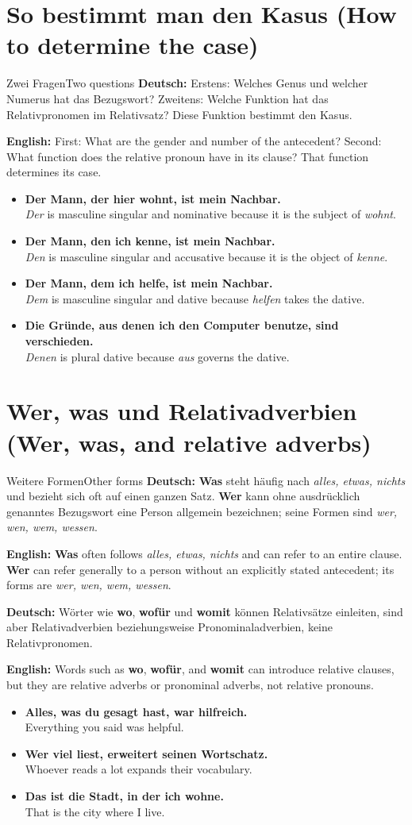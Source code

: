 \documentclass[a4paper,11pt]{article}
\newcommand{\GermanText}[1]{\textbf{Deutsch: }#1\par}
\newcommand{\EnglishText}[1]{{\small\color{SoftGray}\textbf{English: }#1\par}}
\newcommand{\ExampleItem}[2]{\item \textbf{#1}\\{\small\color{SoftGray}#2}}
\begin{document}
\section{So bestimmt man den Kasus (How to determine the case)}
\begin{grammarentry}{Zwei Fragen}{Two questions}
\GermanText{Erstens: Welches Genus und welcher Numerus hat das Bezugswort? Zweitens: Welche Funktion hat das Relativpronomen im Relativsatz? Diese Funktion bestimmt den Kasus.}
\EnglishText{First: What are the gender and number of the antecedent? Second: What function does the relative pronoun have in its clause? That function determines its case.}
\end{grammarentry}
\begin{exbox}\begin{itemize}
\ExampleItem{Der Mann, der hier wohnt, ist mein Nachbar.}{\emph{Der} is masculine singular and nominative because it is the subject of \emph{wohnt}.}
\ExampleItem{Der Mann, den ich kenne, ist mein Nachbar.}{\emph{Den} is masculine singular and accusative because it is the object of \emph{kenne}.}
\ExampleItem{Der Mann, dem ich helfe, ist mein Nachbar.}{\emph{Dem} is masculine singular and dative because \emph{helfen} takes the dative.}
\ExampleItem{Die Gründe, aus denen ich den Computer benutze, sind verschieden.}{\emph{Denen} is plural dative because \emph{aus} governs the dative.}
\end{itemize}\end{exbox}

\section{Wer, was und Relativadverbien (Wer, was, and relative adverbs)}
\begin{grammarentry}{Weitere Formen}{Other forms}
\GermanText{\textbf{Was} steht häufig nach \emph{alles, etwas, nichts} und bezieht sich oft auf einen ganzen Satz. \textbf{Wer} kann ohne ausdrücklich genanntes Bezugswort eine Person allgemein bezeichnen; seine Formen sind \emph{wer, wen, wem, wessen}.}
\EnglishText{\textbf{Was} often follows \emph{alles, etwas, nichts} and can refer to an entire clause. \textbf{Wer} can refer generally to a person without an explicitly stated antecedent; its forms are \emph{wer, wen, wem, wessen}.}
\GermanText{Wörter wie \textbf{wo}, \textbf{wofür} und \textbf{womit} können Relativsätze einleiten, sind aber Relativadverbien beziehungsweise Pronominaladverbien, keine Relativpronomen.}
\EnglishText{Words such as \textbf{wo}, \textbf{wofür}, and \textbf{womit} can introduce relative clauses, but they are relative adverbs or pronominal adverbs, not relative pronouns.}
\end{grammarentry}
\begin{exbox}\begin{itemize}
\ExampleItem{Alles, was du gesagt hast, war hilfreich.}{Everything you said was helpful.}
\ExampleItem{Wer viel liest, erweitert seinen Wortschatz.}{Whoever reads a lot expands their vocabulary.}
\ExampleItem{Das ist die Stadt, in der ich wohne.}{That is the city where I live.}
\end{itemize}\end{exbox}
\end{document}
